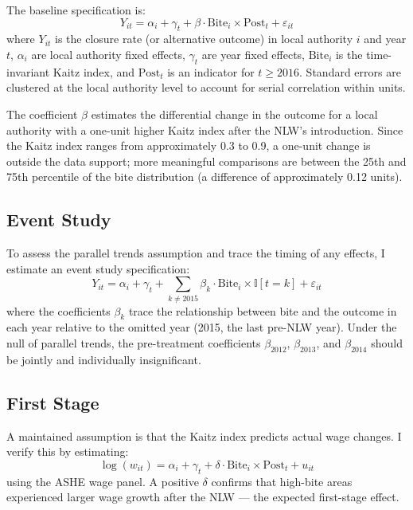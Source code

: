 \documentclass[12pt]{article}
\newcommand{\ind}{\mathbb{I}}
\begin{document}
The baseline specification is:
\begin{equation}
    Y_{it} = \alpha_i + \gamma_t + \beta \cdot \text{Bite}_i \times \text{Post}_t + \varepsilon_{it}
\label{eq:baseline}
\end{equation}
where $Y_{it}$ is the closure rate (or alternative outcome) in local authority $i$ and year $t$, $\alpha_i$ are local authority fixed effects, $\gamma_t$ are year fixed effects, $\text{Bite}_i$ is the time-invariant Kaitz index, and $\text{Post}_t$ is an indicator for $t \geq 2016$. Standard errors are clustered at the local authority level to account for serial correlation within units.

The coefficient $\beta$ estimates the differential change in the outcome for a local authority with a one-unit higher Kaitz index after the NLW's introduction. Since the Kaitz index ranges from approximately 0.3 to 0.9, a one-unit change is outside the data support; more meaningful comparisons are between the 25th and 75th percentile of the bite distribution (a difference of approximately 0.12 units).

\subsection{Event Study}

To assess the parallel trends assumption and trace the timing of any effects, I estimate an event study specification:
\begin{equation}
    Y_{it} = \alpha_i + \gamma_t + \sum_{k \neq 2015} \beta_k \cdot \text{Bite}_i \times \ind[t = k] + \varepsilon_{it}
\label{eq:eventstudy}
\end{equation}
where the coefficients $\beta_k$ trace the relationship between bite and the outcome in each year relative to the omitted year (2015, the last pre-NLW year). Under the null of parallel trends, the pre-treatment coefficients $\beta_{2012}$, $\beta_{2013}$, and $\beta_{2014}$ should be jointly and individually insignificant.

\subsection{First Stage}

A maintained assumption is that the Kaitz index predicts actual wage changes. I verify this by estimating:
\begin{equation}
    \log(w_{it}) = \alpha_i + \gamma_t + \delta \cdot \text{Bite}_i \times \text{Post}_t + u_{it}
\end{equation}
using the ASHE wage panel. A positive $\delta$ confirms that high-bite areas experienced larger wage growth after the NLW --- the expected first-stage effect.
\end{document}
